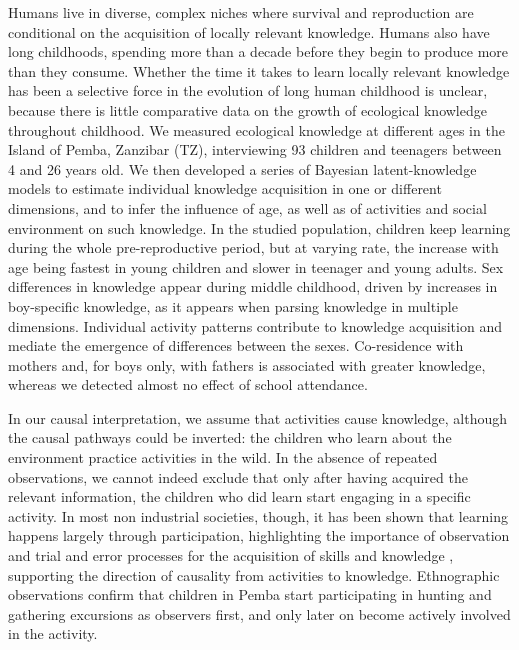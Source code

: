 Humans live in diverse, complex niches where survival and reproduction are conditional on the acquisition of locally relevant knowledge. Humans also have long childhoods, spending more than a decade before they begin to produce more than they consume. Whether the time it takes to learn locally relevant knowledge has been a selective force in the evolution of long human childhood is unclear, because there is little comparative data on the growth of ecological knowledge throughout childhood. 
    We measured ecological knowledge at different ages in the Island of Pemba, Zanzibar (TZ), interviewing 93 children and teenagers between 4 and 26 years old.
    We then developed a series of Bayesian latent-knowledge models to estimate individual knowledge acquisition in one or different dimensions, and to infer the influence of age, as well as of activities and social environment on such knowledge.
    In the studied population, children keep learning during the whole pre-reproductive period, but at varying rate, the increase with age being fastest in young children and slower in teenager and young adults. Sex differences in knowledge appear during middle childhood, driven by increases in boy-specific knowledge, as it appears when parsing knowledge in multiple dimensions. Individual activity patterns contribute to knowledge acquisition and mediate the emergence of differences between the sexes. Co-residence with mothers and, for boys only, with fathers is associated with greater knowledge, whereas we detected almost no effect of school attendance. 
    
In our causal interpretation, we assume that activities cause knowledge, although the causal pathways could be inverted: the children who learn about the environment practice activities in the wild. In the absence of repeated observations, we cannot indeed exclude that only after having acquired the relevant information, the children who did learn start engaging in a specific activity. In most non industrial societies, though, it has been shown that learning happens largely through participation, highlighting the importance of observation and trial and error processes for the acquisition of skills and knowledge , supporting the direction of causality from activities to knowledge. Ethnographic observations confirm that children in Pemba start participating in hunting and gathering excursions as observers first, and only later on become actively involved in the activity. 

